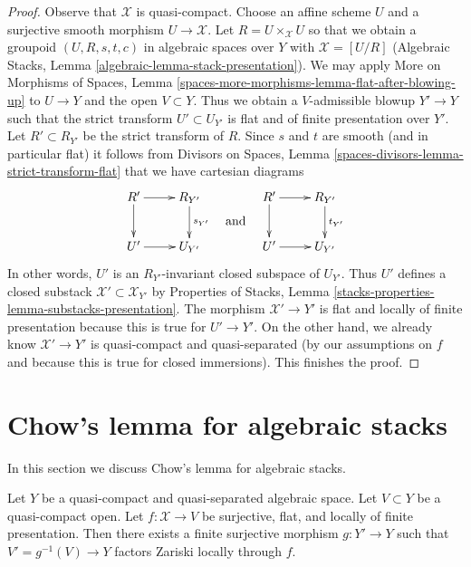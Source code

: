 \begin{proof}
Observe that $\mathcal{X}$ is quasi-compact.
Choose an affine scheme $U$ and a surjective smooth
morphism $U \to \mathcal{X}$.
Let $R = U \times_\mathcal{X} U$ so that we obtain
a groupoid $(U, R, s, t, c)$ in algebraic spaces over $Y$ with
$\mathcal{X} = [U/R]$
(Algebraic Stacks, Lemma \ref{algebraic-lemma-stack-presentation}).
We may apply
More on Morphisms of Spaces, Lemma
\ref{spaces-more-morphisms-lemma-flat-after-blowing-up}
to $U \to Y$ and the open $V \subset Y$.
Thus we obtain a $V$-admissible blowup $Y' \to Y$
such that the strict transform $U' \subset U_{Y'}$
is flat and of finite presentation over $Y'$.
Let $R' \subset R_{Y'}$ be the strict transform of $R$.
Since $s$ and $t$ are smooth (and in particular flat)
it follows from
Divisors on Spaces, Lemma
\ref{spaces-divisors-lemma-strict-transform-flat}
that we have cartesian diagrams
$$
\vcenter{
\xymatrix{
R' \ar[r] \ar[d] & R_{Y'} \ar[d]^{s_{Y'}} \\
U' \ar[r] & U_{Y'}
}
}
\quad\text{and}\quad
\vcenter{
\xymatrix{
R' \ar[r] \ar[d] & R_{Y'} \ar[d]^{t_{Y'}} \\
U' \ar[r] & U_{Y'}
}
}
$$
In other words, $U'$ is an $R_{Y'}$-invariant closed subspace
of $U_{Y'}$. Thus $U'$ defines a closed substack
$\mathcal{X}' \subset \mathcal{X}_{Y'}$ by
Properties of Stacks, Lemma
\ref{stacks-properties-lemma-substacks-presentation}.
The morphism $\mathcal{X}' \to Y'$ is flat and
locally of finite presentation because this is
true for $U' \to Y'$. On the other hand,
we already know $\mathcal{X}' \to Y'$ is quasi-compact and quasi-separated
(by our assumptions on $f$ and because this is true for closed immersions).
This finishes the proof.
\end{proof}















\section{Chow's lemma for algebraic stacks}
\label{section-chow}

\noindent
In this section we discuss Chow's lemma for algebraic stacks.

\begin{lemma}
\label{lemma-finite-cover-factor}
Let $Y$ be a quasi-compact and quasi-separated algebraic space.
Let $V \subset Y$ be a quasi-compact open. Let $f : \mathcal{X} \to V$
be surjective, flat, and locally of finite presentation.
Then there exists a finite surjective morphism $g : Y' \to Y$ such that
$V' = g^{-1}(V) \to Y$ factors Zariski locally through $f$.
\end{lemma}

